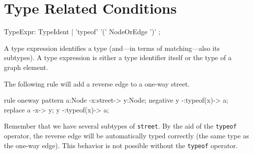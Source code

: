 \section{Type Related Conditions}
\label{typeexpressions}

\begin{rail}
  TypeExpr: TypeIdent | 'typeof' '(' NodeOrEdge ')' ;
\end{rail}
A type expression identifies a type (and---in terms of matching---also its subtypes). A type expression is either a type identifier itself or the type of a graph element.
\begin{example}
The following rule will add a reverse edge to a one-way street.
\begin{grgen}
rule oneway {
    pattern {
        a:Node -x:street-> y:Node;
        negative {
            y -:typeof(x)-> a;
        }
    } 
    replace {
        a -x-> y;
        y -:typeof(x)-> a;
    }
}
\end{grgen}
Remember that we have several subtypes of \texttt{street}. By the aid of the \texttt{typeof} operator, the reverse edge will be automatically typed correctly (the same type as the one-way edge). This behavior is not possible without the \texttt{typeof} operator.
\end{example}

